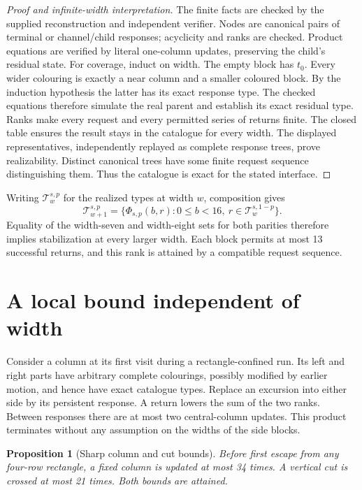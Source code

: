 \documentclass[11pt]{article}
\newtheorem{proposition}[theorem]{Proposition}
\theoremstyle{definition}\newtheorem{definition}[theorem]{Definition}
\begin{document}
\begin{proof}[Proof and infinite-width interpretation]
The finite facts are checked by the supplied reconstruction and independent
verifier. Nodes are canonical pairs of terminal or channel/child responses;
acyclicity and ranks are checked. Product equations are verified by literal
one-column updates, preserving the child's residual state.
For coverage, induct on width. The empty block has $t_0$. Every wider colouring
is exactly a near column and a smaller coloured block. By the induction
hypothesis the latter has its exact response type. The checked equations
therefore simulate the real parent and establish its exact residual type.
Ranks make every request and every permitted series of returns finite.
The closed table ensures the result stays in the catalogue for every width.
The displayed representatives, independently replayed as complete response
trees, prove realizability. Distinct canonical trees have some finite request
sequence distinguishing them. Thus the catalogue is exact for the stated interface.
\end{proof}

Writing $\mathcal T_w^{s,p}$ for the realized types at width $w$, composition gives
\[
\mathcal T_{w+1}^{s,p}
 =\{\Phi_{s,p}(b,r):0\le b<16,\ r\in\mathcal T_w^{s,1-p}\}.
\]
Equality of the width-seven and width-eight sets for both parities therefore
implies stabilization at every larger width. Each block permits at most
13 successful returns, and this rank is attained by a compatible request
sequence.

\section{A local bound independent of width}
Consider a column at its first visit during a rectangle-confined run. Its
left and right parts have arbitrary complete colourings, possibly modified by
earlier motion, and hence have exact catalogue types. Replace an excursion into
either side by its persistent response. A return lowers the sum of the two
ranks. Between responses there are at most two central-column updates. This
product terminates without any assumption on the widths of the side blocks.

\begin{proposition}[Sharp column and cut bounds]\label{prop:column}
Before first escape from any four-row rectangle, a fixed column is updated at
most 34 times. A vertical cut is crossed at most 21 times. Both bounds are attained.
\end{proposition}
\end{document}
